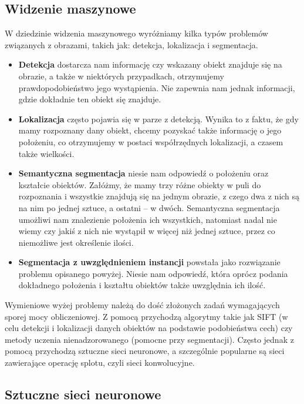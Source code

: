 \documentclass[12pt]{article}
\begin{document}
\subsection{Widzenie maszynowe}
W dziedzinie widzenia maszynowego wyróżniamy kilka typów problemów związanych z obrazami, takich jak: detekcja, lokalizacja i segmentacja.

\begin{itemize}
\item \textbf{Detekcja} dostarcza nam informację czy wskazany obiekt znajduje się na obrazie,
a także w niektórych przypadkach, otrzymujemy prawdopodobieństwo jego wystąpienia. Nie zapewnia nam jednak informacji, gdzie dokładnie ten obiekt się znajduje.

\item \textbf{Lokalizacja} często pojawia się w parze z detekcją. Wynika to z faktu, że gdy mamy rozpoznany dany obiekt, chcemy pozyskać także informację o jego położeniu, co otrzymujemy w postaci współrzędnych lokalizacji, a czasem także wielkości.

\item \textbf{Semantyczna segmentacja} niesie nam odpowiedź o położeniu oraz kształcie obiektów. Załóżmy, że mamy trzy różne obiekty w puli do rozpoznania i wszystkie znajdują się na jednym obrazie, z czego dwa z nich są na nim po jednej sztuce, a ostatni – w dwóch. Semantyczna segmentacja umożliwi nam znalezienie położenia ich wszystkich, natomiast nadal nie wiemy czy jakiś z nich nie wystąpił w więcej niż jednej sztuce, przez co niemożliwe jest określenie ilości.

\item \textbf{Segmentacja z uwzględnieniem instancji} powstała jako rozwiązanie problemu
opisanego powyżej. Niesie nam odpowiedź, która oprócz podania dokładnego
położenia i kształtu obiektów także uwzględnia ich ilość.
\end{itemize} 

Wymieniowe wyżej problemy należą do dość złożonych zadań wymagających sporej mocy obliczeniowej. Z pomocą przychodzą algorytmy takie jak SIFT (w celu detekcji i lokalizacji danych obiektów na podstawie podobieństwa cech) czy metody uczenia nienadzorowanego (pomocne przy segmentacji). Często jednak z pomocą przychodzą sztuczne sieci neuronowe, a szczególnie popularne są sieci zawierające operację splotu, czyli sieci konwolucyjne.

\subsection{Sztuczne sieci neuronowe}
\end{document}
